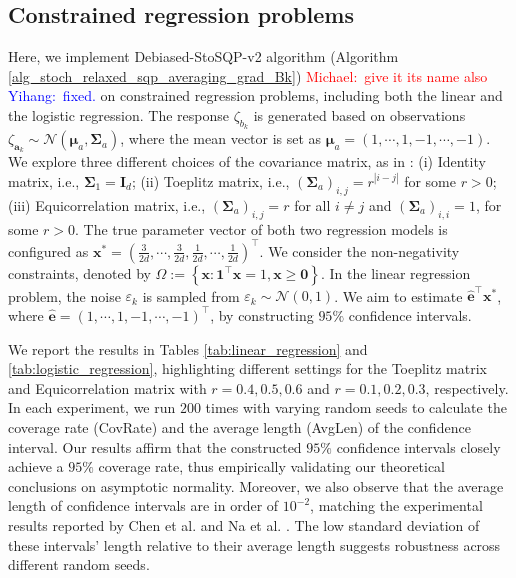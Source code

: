 \documentclass[aos]{imsart}
\numberwithin{equation}{section}
\theoremstyle{plain}
\newcommand{\michael}[1]{\textcolor{red}{Michael:\ #1}}
\newcommand{\yihang}[1]{\textcolor{blue}{Yihang:\ #1}}
\begin{document}
\subsection{Constrained regression problems}

Here, we implement Debiased-StoSQP-v2 algorithm (Algorithm \ref{alg_stoch_relaxed_sqp_averaging_grad_Bk}) 
\michael{give it its name also} \yihang{fixed.}
on constrained regression problems, including both the linear and the logistic regression.
The response $\zeta_{b_k}$ is generated based on observations $\zeta_{\bm{a}_k} \sim \mathcal{N}\left(\bm{\mu}_{a}, \bm{\Sigma}_{a} \right)$, where the mean vector is set as $\bm{\mu}_a = (1, \cdots, 1, -1, \cdots, -1)$. We explore three different choices of the covariance matrix, as in \cite{chen2020statistical}: (i) Identity matrix, i.e., $\bm{\Sigma}_1 = \bm{I}_d$; (ii) Toeplitz matrix, i.e., $(\bm{\Sigma}_{a})_{i,j} = r^{|i-j|}$ for some $r > 0$; (iii) Equicorrelation matrix, i.e., $(\bm{\Sigma}_{a})_{i,j} = r$ for all $i \neq j$ and $(\bm{\Sigma}_{a})_{i,i} = 1$, for some $r > 0$. The true parameter vector of both two regression models is configured as $\bm{x}^{*} = \left( \frac{3}{2d}, \cdots, \frac{3}{2d}, \frac{1}{2d}, \cdots, \frac{1}{2d}\right)^{\top}$. We consider the non-negativity constraints, denoted by $\Omega := \left\{\bm{x}: \bm{1}^{\top} \bm{x} = 1, \bm{x} \geq \bm{0}\right\}$. In the linear regression problem, the noise $\varepsilon_k$ is sampled from $\varepsilon_k \sim \mathcal{N}(0,1)$. We aim to estimate $\hat{\bm{e}}^{\top} \bm{x}^{*}$, where $\hat{\bm{e}} = \left(1,\cdots, 1, -1, \cdots, -1 \right)^{\top}$, by constructing $95\%$ confidence intervals. 

We report the results in Tables \ref{tab:linear_regression} and \ref{tab:logistic_regression}, highlighting different settings for the Toeplitz matrix and Equicorrelation matrix with $r = 0.4, 0.5, 0.6$ and $r=0.1, 0.2, 0.3$, respectively. 
In each experiment, we run $200$ times with varying random seeds to calculate the coverage rate (CovRate) and the average length (AvgLen) of the confidence interval.
Our results affirm that the constructed $95\%$ confidence intervals closely achieve a $95\%$ coverage rate, thus empirically validating our theoretical conclusions on asymptotic normality.
Moreover, we also observe that the average length of confidence intervals are in order of $10^{-2}$, matching the experimental results reported by Chen et al. \cite{chen2020statistical} and Na et al. \cite{na2022asymptotic}. The low standard deviation of these intervals' length relative to their average length suggests robustness across different random seeds. 
\end{document}
